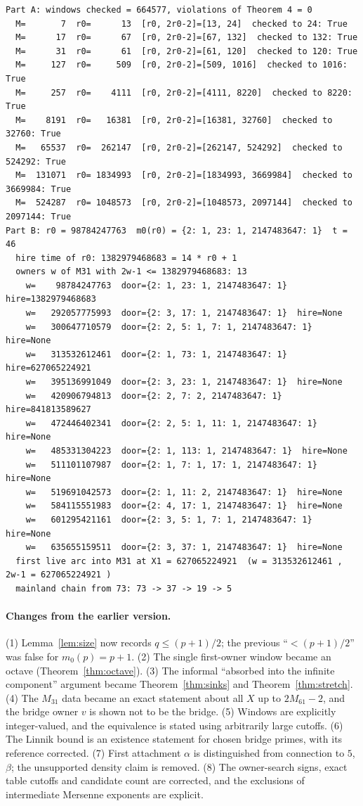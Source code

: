 \documentclass[11pt,a4paper]{article}
\theoremstyle{remark}
\begin{document}
{\footnotesize
\begin{verbatim}
Part A: windows checked = 664577, violations of Theorem 4 = 0
  M=       7  r0=      13  [r0, 2r0-2]=[13, 24]  checked to 24: True
  M=      17  r0=      67  [r0, 2r0-2]=[67, 132]  checked to 132: True
  M=      31  r0=      61  [r0, 2r0-2]=[61, 120]  checked to 120: True
  M=     127  r0=     509  [r0, 2r0-2]=[509, 1016]  checked to 1016: True
  M=     257  r0=    4111  [r0, 2r0-2]=[4111, 8220]  checked to 8220: True
  M=    8191  r0=   16381  [r0, 2r0-2]=[16381, 32760]  checked to 32760: True
  M=   65537  r0=  262147  [r0, 2r0-2]=[262147, 524292]  checked to 524292: True
  M=  131071  r0= 1834993  [r0, 2r0-2]=[1834993, 3669984]  checked to 3669984: True
  M=  524287  r0= 1048573  [r0, 2r0-2]=[1048573, 2097144]  checked to 2097144: True
Part B: r0 = 98784247763  m0(r0) = {2: 1, 23: 1, 2147483647: 1}  t = 46
  hire time of r0: 1382979468683 = 14 * r0 + 1
  owners w of M31 with 2w-1 <= 1382979468683: 13
    w=    98784247763  door={2: 1, 23: 1, 2147483647: 1}  hire=1382979468683
    w=   292057775993  door={2: 3, 17: 1, 2147483647: 1}  hire=None
    w=   300647710579  door={2: 2, 5: 1, 7: 1, 2147483647: 1}  hire=None
    w=   313532612461  door={2: 1, 73: 1, 2147483647: 1}  hire=627065224921
    w=   395136991049  door={2: 3, 23: 1, 2147483647: 1}  hire=None
    w=   420906794813  door={2: 2, 7: 2, 2147483647: 1}  hire=841813589627
    w=   472446402341  door={2: 2, 5: 1, 11: 1, 2147483647: 1}  hire=None
    w=   485331304223  door={2: 1, 113: 1, 2147483647: 1}  hire=None
    w=   511101107987  door={2: 1, 7: 1, 17: 1, 2147483647: 1}  hire=None
    w=   519691042573  door={2: 1, 11: 2, 2147483647: 1}  hire=None
    w=   584115551983  door={2: 4, 17: 1, 2147483647: 1}  hire=None
    w=   601295421161  door={2: 3, 5: 1, 7: 1, 2147483647: 1}  hire=None
    w=   635655159511  door={2: 3, 37: 1, 2147483647: 1}  hire=None
  first live arc into M31 at X1 = 627065224921  (w = 313532612461 , 2w-1 = 627065224921 )
  mainland chain from 73: 73 -> 37 -> 19 -> 5
\end{verbatim}
}


\paragraph{Changes from the earlier version.}
(1) Lemma~\ref{lem:size} now records \(q\le (p+1)/2\); the previous ``\(<(p+1)/2\)'' was false for \(m_0(p)=p+1\).
(2) The single first-owner window became an octave (Theorem~\ref{thm:octave}).
(3) The informal ``absorbed into the infinite component'' argument became Theorem~\ref{thm:sinks} and Theorem~\ref{thm:stretch}.
(4) The \(M_{31}\) data became an exact statement about all \(X\) up to \(2M_{61}-2\), and the bridge owner \(v\) is shown not to be the bridge.
(5) Windows are explicitly integer-valued, and the equivalence is stated using arbitrarily large cutoffs.
(6) The Linnik bound is an existence statement for chosen bridge primes, with its reference corrected.
(7) First attachment \(\alpha\) is distinguished from connection to \(5\), \(\beta\); the unsupported density claim is removed.
(8) The owner-search signs, exact table cutoffs and candidate count are corrected, and the exclusions of intermediate Mersenne exponents are explicit.
\end{document}
